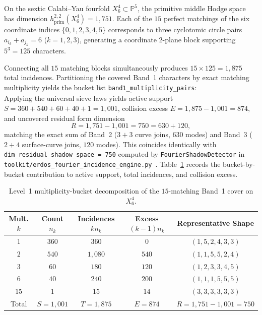 \documentclass[11pt,a4paper]{article}
\begin{document}
On the sextic Calabi--Yau fourfold $X_6^4 \subset \mathbb{P}^5$, the primitive middle Hodge space has dimension $h^{2,2}_{\mathrm{prim}}(X_6^4) = 1{,}751$. Each of the $15$ perfect matchings of the six coordinate indices $\{0, 1, 2, 3, 4, 5\}$ corresponds to three cyclotomic circle pairs $a_{i_k} + a_{j_k} = 6$ ($k = 1, 2, 3$), generating a coordinate $2$-plane block supporting $5^3 = 125$ characters.

Connecting all $15$ matching blocks simultaneously produces $15 \times 125 = 1{,}875$ total incidences. Partitioning the covered Band~1 characters by exact matching multiplicity yields the bucket list \texttt{band1\_multiplicity\_pairs}:
\begin{equation}
  [(1, 360),\; (2, 540),\; (3, 60),\; (6, 40),\; (15, 1)].
\end{equation}
Applying the universal sieve laws yields active support $S = 360 + 540 + 60 + 40 + 1 = 1{,}001$, collision excess $E = 1{,}875 - 1{,}001 = 874$, and uncovered residual form dimension
\begin{equation}
  R = 1{,}751 - 1{,}001 = 750 = 630 + 120,
\end{equation}
matching the exact sum of Band~2 ($3+3$ curve joins, $630$ modes) and Band~3 ($2+4$ surface-curve joins, $120$ modes). This coincides identically with \texttt{dim\_residual\_shadow\_space = 750} computed by \texttt{FourierShadowDetector} in \texttt{toolkit/erdos\_fourier\_incidence\_engine.py}~\cite{Griffiths1969,Shioda1979}. Table~\ref{tab:level1_buckets} records the bucket-by-bucket contribution to active support, total incidences, and collision excess.

\begin{table}[htbp]
  \centering
  \footnotesize
  \setlength{\tabcolsep}{3pt}
  \caption{Level~1 multiplicity-bucket decomposition of the $15$-matching Band~1 cover on $X_6^4$.}
  \label{tab:level1_buckets}
  \begin{tabular}{ccccc}
    \toprule
    Mult. $k$ & Count $n_k$ & Incidences $k n_k$ & Excess $(k-1)n_k$ & Representative Shape \\
    \midrule
    $1$ & $360$ & $360$ & $0$ & $(1,5,2,4,3,3)$ \\
    $2$ & $540$ & $1{,}080$ & $540$ & $(1,1,5,5,2,4)$ \\
    $3$ & $60$ & $180$ & $120$ & $(1,2,3,3,4,5)$ \\
    $6$ & $40$ & $240$ & $200$ & $(1,1,1,5,5,5)$ \\
    $15$ & $1$ & $15$ & $14$ & $(3,3,3,3,3,3)$ \\
    \midrule
    Total & $S = 1{,}001$ & $T = 1{,}875$ & $E = 874$ & $R = 1{,}751 - 1{,}001 = 750$ \\
    \bottomrule
  \end{tabular}
\end{table}
\end{document}
